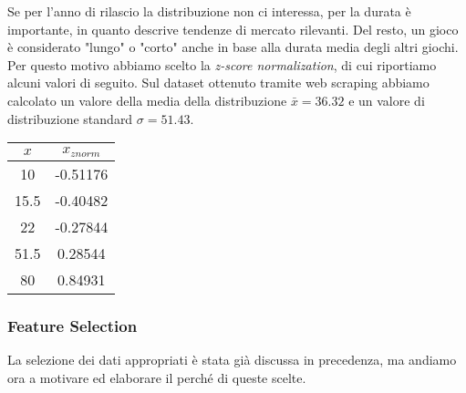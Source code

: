             \newpage
            Se per l'anno di rilascio la distribuzione non ci interessa, per la durata è importante, in quanto descrive tendenze di mercato rilevanti. Del resto, un gioco è considerato "lungo" o "corto" anche in base alla durata media degli altri giochi. Per questo motivo abbiamo scelto la \textit{z-score normalization}, di cui riportiamo alcuni valori di seguito. Sul dataset ottenuto tramite web scraping abbiamo calcolato un valore della media della distribuzione $\bar{x} = 36.32$ e un valore di distribuzione standard $\sigma = 51.43$.
            \begin{center}
                \begin{tabular}{|c|c|}
                \hline
                $x$  & $x_{znorm}$ \\ \hline
                10 & -0.51176     \\ \hline
                15.5 & -0.40482     \\ \hline
                22 & -0.27844     \\ \hline
                51.5 & 0.28544     \\ \hline
                80 & 0.84931     \\ \hline
                \end{tabular}
            \end{center}
            
        \subsubsection{Feature Selection}
            La selezione dei dati appropriati è stata già discussa in precedenza, ma andiamo ora a motivare ed elaborare il perché di queste scelte.
            
